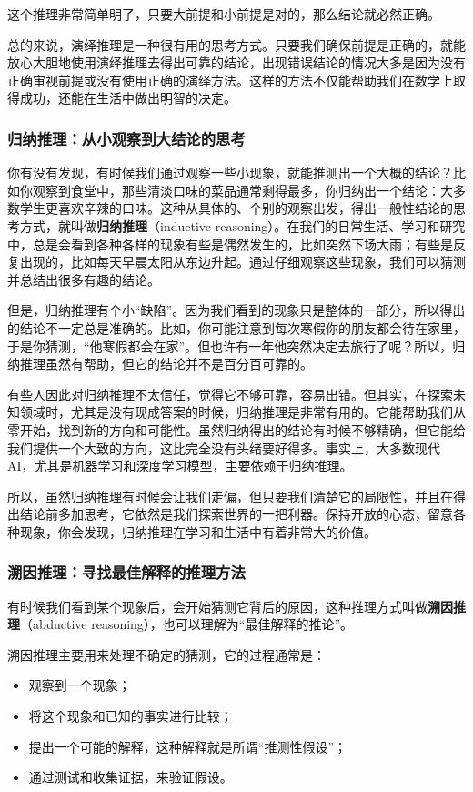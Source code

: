 这个推理非常简单明了，只要大前提和小前提是对的，那么结论就必然正确。

总的来说，演绎推理是一种很有用的思考方式。只要我们确保前提是正确的，就能放心大胆地使用演绎推理去得出可靠的结论，出现错误结论的情况大多是因为没有正确审视前提或没有使用正确的演绎方法。这样的方法不仅能帮助我们在数学上取得成功，还能在生活中做出明智的决定。

\subsubsection{归纳推理：从小观察到大结论的思考}

你有没有发现，有时候我们通过观察一些小现象，就能推测出一个大概的结论？比如你观察到食堂中，那些清淡口味的菜品通常剩得最多，你归纳出一个结论：大多数学生更喜欢辛辣的口味。这种从具体的、个别的观察出发，得出一般性结论的思考方式，就叫做\textbf{归纳推理}（inductive reasoning）。在我们的日常生活、学习和研究中，总是会看到各种各样的现象有些是偶然发生的，比如突然下场大雨；有些是反复出现的，比如每天早晨太阳从东边升起。通过仔细观察这些现象，我们可以猜测并总结出很多有趣的结论。

但是，归纳推理有个小“缺陷”。因为我们看到的现象只是整体的一部分，所以得出的结论不一定总是准确的。比如，你可能注意到每次寒假你的朋友都会待在家里，于是你猜测，“他寒假都会在家”。但也许有一年他突然决定去旅行了呢？所以，归纳推理虽然有帮助，但它的结论并不是百分百可靠的。

有些人因此对归纳推理不太信任，觉得它不够可靠，容易出错。但其实，在探索未知领域时，尤其是没有现成答案的时候，归纳推理是非常有用的。它能帮助我们从零开始，找到新的方向和可能性。虽然归纳得出的结论有时候不够精确，但它能给我们提供一个大致的方向，这比完全没有头绪要好得多。事实上，大多数现代AI，尤其是机器学习和深度学习模型，主要依赖于归纳推理。

所以，虽然归纳推理有时候会让我们走偏，但只要我们清楚它的局限性，并且在得出结论前多加思考，它依然是我们探索世界的一把利器。保持开放的心态，留意各种现象，你会发现，归纳推理在学习和生活中有着非常大的价值。

\subsubsection{溯因推理：寻找最佳解释的推理方法}

有时候我们看到某个现象后，会开始猜测它背后的原因，这种推理方式叫做\textbf{溯因推理}（abductive reasoning），也可以理解为“最佳解释的推论”。

溯因推理主要用来处理不确定的猜测，它的过程通常是：
\begin{itemize}
\item 观察到一个现象；
\item 将这个现象和已知的事实进行比较；
\item 提出一个可能的解释，这种解释就是所谓“推测性假设”；
\item 通过测试和收集证据，来验证假设。
\end{itemize}

